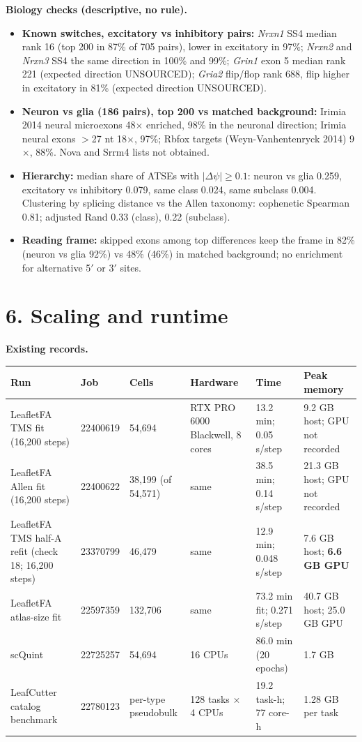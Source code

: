\documentclass[10pt]{article}
\begin{document}
\textbf{Biology checks (descriptive, no rule).}
\begin{itemize}
  \item \textbf{Known switches, excitatory vs inhibitory pairs:} \textit{Nrxn1} SS4 median rank 16 (top 200 in 87\% of 705
    pairs), lower in excitatory in 97\%; \textit{Nrxn2} and \textit{Nrxn3} SS4 the same direction in 100\% and 99\%;
    \textit{Grin1} exon 5 median rank 221 (expected direction UNSOURCED); \textit{Gria2} flip/flop rank 688, flip higher in
    excitatory in 81\% (expected direction UNSOURCED).
  \item \textbf{Neuron vs glia (186 pairs), top 200 vs matched background:} Irimia 2014 neural microexons 48$\times$
    enriched, 98\% in the neuronal direction; Irimia neural exons $>$27 nt 18$\times$, 97\%; Rbfox targets
    (Weyn-Vanhentenryck 2014) 9$\times$, 88\%. Nova and Srrm4 lists not obtained.
  \item \textbf{Hierarchy:} median share of ATSEs with $|\Delta\psi| \geq 0.1$: neuron vs glia 0.259, excitatory vs
    inhibitory 0.079, same class 0.024, same subclass 0.004. Clustering by splicing distance vs the Allen taxonomy:
    cophenetic Spearman 0.81; adjusted Rand 0.33 (class), 0.22 (subclass).
  \item \textbf{Reading frame:} skipped exons among top differences keep the frame in 82\% (neuron vs glia 92\%) vs
    48\% (46\%) in matched background; no enrichment for alternative 5$'$ or 3$'$ sites.
\end{itemize}

\clearpage
\section*{6. Scaling and runtime}
\textbf{Existing records.}
\footnotesize
\begin{longtable}{L{34mm}L{15mm}L{20mm}L{30mm}L{28mm}L{24mm}}
\toprule
Run & Job & Cells & Hardware & Time & Peak memory \\
\midrule
LeafletFA TMS fit (16,200 steps) & 22400619 & 54,694 & RTX PRO 6000 Blackwell, 8 cores & 13.2 min; 0.05 s/step & 9.2 GB host; GPU not recorded \\
LeafletFA Allen fit (16,200 steps) & 22400622 & 38,199 (of 54,571) & same & 38.5 min; 0.14 s/step & 21.3 GB host; GPU not recorded \\
LeafletFA TMS half-A refit (check 18; 16,200 steps) & 23370799 & 46,479 & same & 12.9 min; 0.048 s/step & 7.6 GB host; \textbf{6.6 GB GPU} \\
LeafletFA atlas-size fit & 22597359 & 132,706 & same & 73.2 min fit; 0.271 s/step & 40.7 GB host; 25.0 GB GPU \\
scQuint & 22725257 & 54,694 & 16 CPUs & 86.0 min (20 epochs) & 1.7 GB \\
LeafCutter catalog benchmark & 22780123 & per-type pseudobulk & 128 tasks $\times$ 4 CPUs & 19.2 task-h; 77 core-h & 1.28 GB per task \\
\bottomrule
\end{longtable}
\end{document}
